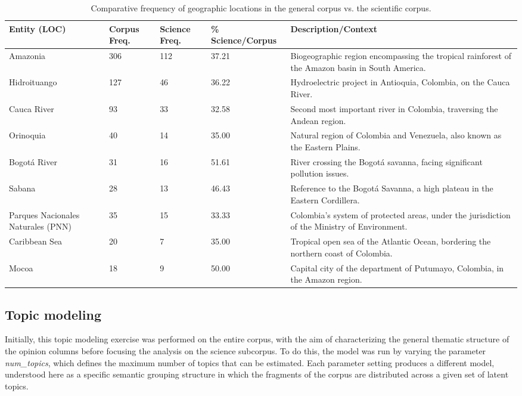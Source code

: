 \documentclass[11pt,a4paper]{article}
\begin{document}
	\begin{table}[H]
		\centering
		\caption{Comparative frequency of geographic locations in the general corpus vs. the scientific corpus.}
		\label{tab:ents_loc}
		\footnotesize 
		\begin{tabular}{p{3cm}P{2.2cm}P{2.2cm}P{2.2cm}p{5cm}}
			\toprule
			\textbf{Entity (LOC)} & 
			\textbf{Corpus Freq.} & 
			\textbf{Science Freq.} & 
			\textbf{\% Science/Corpus} & 
			\textbf{Description/Context} \\
			\midrule
			Amazonia & 306 & 112 & 37.21 & Biogeographic region encompassing the tropical rainforest of the Amazon basin in South America. \\
			Hidroituango & 127 & 46 & 36.22 & Hydroelectric project in Antioquia, Colombia, on the Cauca River. \\
			Cauca River & 93 & 33 & 32.58 & Second most important river in Colombia, traversing the Andean region. \\
			Orinoquia & 40 & 14 & 35.00 & Natural region of Colombia and Venezuela, also known as the Eastern Plains. \\
			Bogotá River & 31 & 16 & 51.61 & River crossing the Bogotá savanna, facing significant pollution issues. \\
			Sabana & 28 & 13 & 46.43 & Reference to the Bogotá Savanna, a high plateau in the Eastern Cordillera. \\
			Parques Nacionales Naturales (PNN) & 35 & 15 & 33.33 & Colombia's system of protected areas, under the jurisdiction of the Ministry of Environment. \\
			Caribbean Sea & 20 & 7 & 35.00 & Tropical open sea of the Atlantic Ocean, bordering the northern coast of Colombia. \\
			Mocoa & 18 & 9 & 50.00 & Capital city of the department of Putumayo, Colombia, in the Amazon region. \\
			\bottomrule
		\end{tabular}
	\end{table}
	
	
\subsection{Topic modeling}
Initially, this topic modeling exercise was performed on the entire corpus, with the aim of characterizing the general thematic structure of the opinion columns before focusing the analysis on the science subcorpus. To do this, the model was run by varying the parameter \textit{num\_topics}, which defines the maximum number of topics that can be estimated. Each parameter setting produces a different model, understood here as a specific semantic grouping structure in which the fragments of the corpus are distributed across a given set of latent topics.
\end{document}
